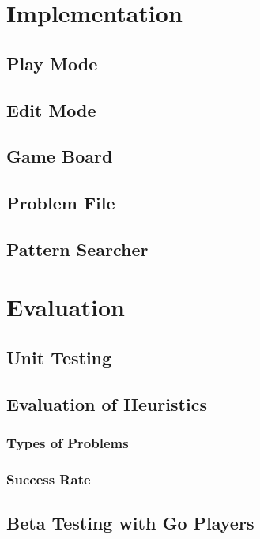 \documentclass{l4proj}
\begin{document}
\chapter{Implementation}

\section{Play Mode}

\section{Edit Mode}

\section{Game Board}

\section{Problem File}

\section{Pattern Searcher}








\chapter{Evaluation}

\section{Unit Testing}

\section{Evaluation of Heuristics}
\subsection{Types of Problems}
\subsection{Success Rate}

\section{Beta Testing with Go Players}
\end{document}
